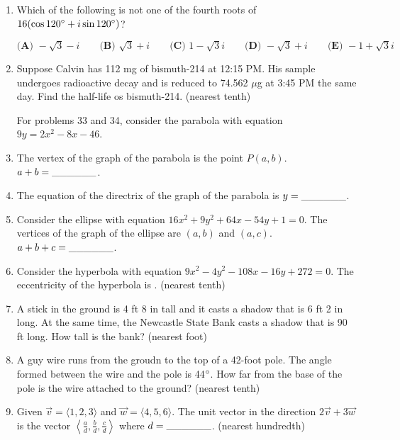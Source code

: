 \documentclass[../uilmath.tex]{subfiles}
\begin{document}
\begin{enumerate}[label=\bfseries\arabic*.]
    \item %
    Which of the following is not one of the fourth roots of $16(\cos 120\degree + i\sin 120\degree)$?

    $\textbf{(A) } -\sqrt{3}-i \qquad \textbf{(B) } \sqrt{3}+i \qquad \textbf{(C) } 1-\sqrt{3}i \qquad \textbf{(D) } -\sqrt{3}+i \qquad \textbf{(E) } -1+\sqrt{3}i$

    \item %
    Suppose Calvin has 112 mg of bismuth-214 at 12:15 PM. His sample undergoes radioactive decay and is 
    reduced to 74.562 $\mu$g at 3:45 PM the same day. Find the half-life os bismuth-214. (nearest tenth)


    For problems 33 and 34, consider the parabola with equation $9y=2x^2-8x-46$.
    \item %
    The vertex of the graph of the parabola is the point $P(a,b)$. $a+b=\_\_\_\_\_\_$.

    \item %
    The equation of the directrix of the graph of the parabola is $y=\_\_\_\_\_\_$.

    \item %
    Consider the ellipse with equation $16x^2+9y^2+64x-54y+1=0$. The vertices of the graph of the ellipse are 
    $(a,b)$ and $(a,c)$. $a+b+c=\_\_\_\_\_\_$.

    \item %
    Consider the hyperbola with equation $9x^2-4y^2-108x-16y+272=0$. The eccentricity 
    of the hyperbola is \blank. (nearest tenth)

    \item %
    A stick in the ground is 4 ft 8 in tall and it casts a shadow that is 6 ft 2 in long. At the same time, 
    the Newcastle State Bank casts a shadow that is 90 ft long. How tall is the bank? (nearest foot)

    \item %
    A guy wire runs from the groudn to the top of a 42-foot pole. The angle formed between the wire and the pole is 44$\degree$. How far 
    from the base of the pole is the wire attached to the ground? (nearest tenth)

    \item %
    Given $\vec{v}=\langle 1,2,3 \rangle$ and $\vec{w}=\langle 4,5,6 \rangle$. The unit vector in the direction $2\vec{v}+3\vec{w}$ is the 
    vector $\left\langle \frac{a}{d},\frac{b}{d},\frac{c}{d}\right\rangle$ where $d=\_\_\_\_\_\_$. (nearest hundredth)


\end{enumerate}
\end{document}
